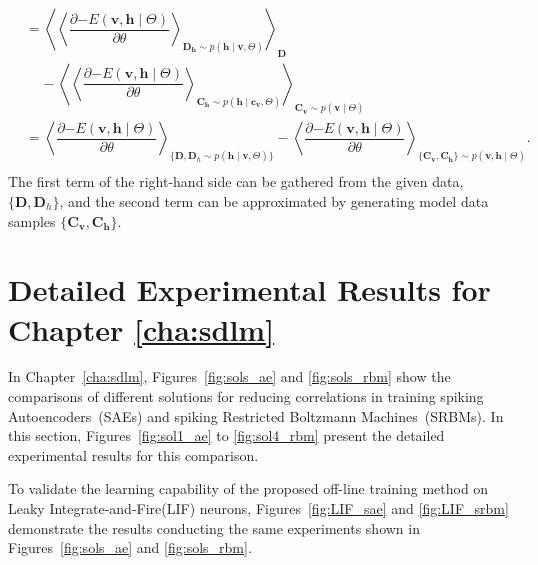 \begin{equation}
\begin{aligned}
& = \left \langle \left \langle \dfrac{\partial {-E}(\mathbf{v}, \mathbf{h} \mid \Theta)}{\partial \theta} \right \rangle_{\mathbf{D_h} \sim p( \mathbf{h} \mid \mathbf{v}, \Theta)} \right \rangle_{\mathbf{D}}
\\&~~~~~- \left \langle \left \langle \dfrac{\partial {-E}(\mathbf{v}, \mathbf{h} \mid \Theta)}{\partial \theta} \right \rangle_{\mathbf{C_h} \sim p( \mathbf{h} \mid \mathbf{c_v}, \Theta)} \right \rangle_{\mathbf{C_v} \sim p(\mathbf{v} \mid \Theta)}  \\
& = \left \langle \dfrac{\partial {-E}(\mathbf{v}, \mathbf{h} \mid \Theta)}{\partial \theta} \right \rangle_{\{\mathbf{D}, \mathbf{D}_h \sim p( \mathbf{h} \mid \mathbf{v}, \Theta) \}}
- \left \langle \dfrac{\partial {-E}(\mathbf{v}, \mathbf{h} \mid \Theta)}{\partial \theta} \right \rangle_{\{\mathbf{C_v}, \mathbf{C_h}\} \sim p( \mathbf{v}, \mathbf{h} \mid  \Theta)}. \\
\end{aligned}
\label{app_equ:RBM}
\end{equation}
The first term of the right-hand side can be gathered from the given data, $ \{\mathbf{D}, \mathbf{D}_h\}$, and the second term can be approximated by generating model data samples $ \{\mathbf{C_v}, \mathbf{C_h}\} $.

\chapter[Detailed Experimental Results]{Detailed Experimental Results for Chapter \ref{cha:sdlm}}
\label{sec:app2}
In Chapter~\ref{cha:sdlm}, Figures~\ref{fig:sols_ae} and \ref{fig:sols_rbm} show the comparisons of different solutions for reducing correlations in training spiking Autoencoders~(SAEs) and spiking Restricted Boltzmann Machines~(SRBMs).
In this section, Figures~\ref{fig:sol1_ae} to \ref{fig:sol4_rbm} present the detailed experimental results for this comparison.

To validate the learning capability of the proposed off-line training method on Leaky Integrate-and-Fire(LIF) neurons, Figures~\ref{fig:LIF_sae} and \ref{fig:LIF_srbm} demonstrate the results conducting the same experiments shown in Figures~\ref{fig:sols_ae} and \ref{fig:sols_rbm}.


